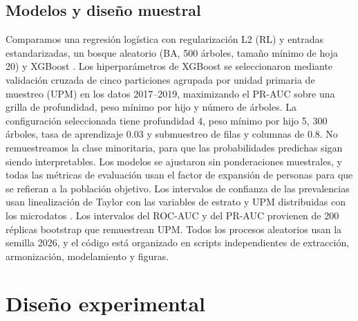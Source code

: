 \documentclass[conference]{IEEEtran}
\begin{document}
\subsection{Modelos y diseño muestral}
Comparamos una regresión logística con regularización L2 (RL) y entradas estandarizadas, un bosque aleatorio (BA, 500 árboles, tamaño mínimo de hoja 20) \cite{breiman2001} y XGBoost \cite{chen2016}. Los hiperparámetros de XGBoost se seleccionaron mediante validación cruzada de cinco particiones agrupada por unidad primaria de muestreo (UPM) en los datos 2017--2019, maximizando el PR-AUC sobre una grilla de profundidad, peso mínimo por hijo y número de árboles. La configuración seleccionada tiene profundidad 4, peso mínimo por hijo 5, 300 árboles, tasa de aprendizaje 0.03 y submuestreo de filas y columnas de 0.8. No remuestreamos la clase minoritaria, para que las probabilidades predichas sigan siendo interpretables. Los modelos se ajustaron sin ponderaciones muestrales, y todas las métricas de evaluación usan el factor de expansión de personas para que se refieran a la población objetivo. Los intervalos de confianza de las prevalencias usan linealización de Taylor con las variables de estrato y UPM distribuidas con los microdatos \cite{lumley2004}. Los intervalos del ROC-AUC y del PR-AUC provienen de 200 réplicas bootstrap que remuestrean UPM. Todos los procesos aleatorios usan la semilla 2026, y el código está organizado en scripts independientes de extracción, armonización, modelamiento y figuras.

\section{Diseño experimental}
\end{document}
